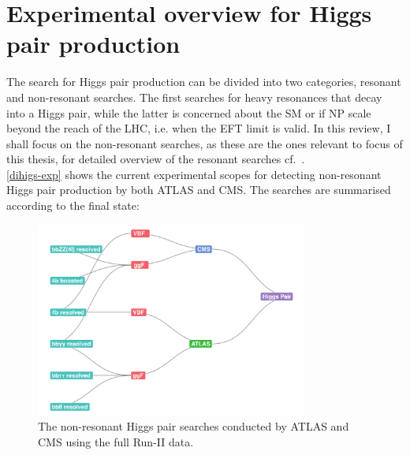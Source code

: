 \section{Experimental overview for Higgs pair production \label{exphh}  }
The search for Higgs pair production can be divided into two categories, resonant and non-resonant searches. The first searches for heavy resonances that decay into a Higgs pair, while the latter is concerned about the SM or if NP scale beyond the reach of the LHC, i.e. when the EFT limit is valid. In this review, I shall focus on the non-resonant searches, as these are the ones relevant to focus of this thesis, for detailed overview of the resonant searches cf.~\cite{DiMicco:2019ngk}.\\
%
\autoref{dihigs-exp} shows the current experimental scopes for detecting non-resonant Higgs pair production by both ATLAS and CMS. The searches are summarised according to the final state:
\begin{figure}[!htpb]
	\centering
	\includegraphics[width = 0.8\textwidth]{./figures/HH-exp-network}
	\caption{The non-resonant Higgs pair searches conducted by ATLAS and CMS using the full Run-II data.} 
	\label{dihigs-exp}
\end{figure}
